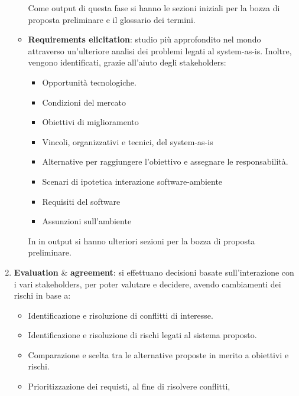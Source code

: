 \begin{enumerate}
\begin{itemize}
                        Come output di questa fase si hanno le sezioni iniziali per la bozza di
                        proposta preliminare e il glossario dei termini.
                  \item \textbf{Requirements elicitation}: studio più approfondito nel mondo
                        attraverso un'ulteriore analisi dei problemi legati al system-as-is.
                        Inoltre, vengono identificati, grazie all'aiuto degli stakeholders:
                        \begin{itemize}
                              \item Opportunità tecnologiche.
                              \item Condizioni del mercato
                              \item Obiettivi di miglioramento
                              \item Vincoli, organizzativi e tecnici, del system-as-is
                              \item Alternative per raggiungere l'obiettivo e assegnare le responsabilità.
                              \item Scenari di ipotetica interazione software-ambiente
                              \item Requisiti del software
                              \item Assunzioni sull'ambiente
                        \end{itemize}
                        In in output si hanno ulteriori sezioni per la bozza di proposta preliminare.
            \end{itemize}
      \item \textbf{Evaluation} $\&$ \textbf{agreement}: si effettuano decisioni
            basate sull'interazione con i vari stakeholders, per poter valutare e decidere,
            avendo cambiamenti dei rischi in base a:
            \begin{itemize}
                  \item Identificazione e risoluzione di conflitti di interesse.
                  \item Identificazione e risoluzione di rischi legati al sistema proposto.
                  \item Comparazione e scelta tra le alternative proposte in merito a
                        obiettivi e rischi.
                  \item Prioritizzazione dei requisti, al fine di risolvere conflitti,

\end{itemize}
\end{enumerate}
